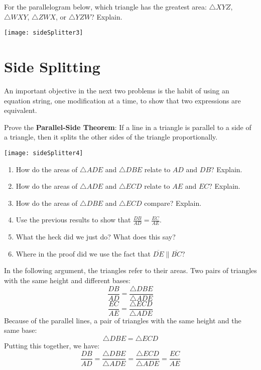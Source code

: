 \documentclass[nooutcomes]{ximera}
\begin{document}
\begin{problem}
For the parallelogram below, which triangle has the greatest area: $\triangle XYZ$, $\triangle WXY$, $\triangle ZWX$, or $\triangle YZW$?  Explain.  
\begin{image}
\texttt{[image: sideSplitter3]}
\end{image}
\vfill
\end{problem}

\newpage
\section*{Side Splitting}
\begin{teachingnote}
An important objective in the next two problems is the habit of using an equation string, one modification at a time, to show that two expressions are equivalent.
\end{teachingnote}

\begin{problem}
Prove the \textbf{Parallel-Side Theorem}:  If a line in a triangle is parallel to a side of a triangle, then it splits the other sides of the triangle proportionally. 
\begin{image}
\texttt{[image: sideSplitter4]}
\end{image}
\begin{enumerate}
\item How do the areas of $\triangle ADE$ and $\triangle DBE$ relate to $AD$ and $DB$?  Explain.  
\item How do the areas of $\triangle ADE$ and $\triangle ECD$ relate to $AE$ and $EC$?  Explain. 
\item How do the areas of $\triangle DBE$ and $\triangle ECD$ compare?  Explain.  
\item Use the previous results to show that $\frac{DB}{AD} = \frac{EC}{AE}$.  
\item What the heck did we just do?  What does this say?
\item Where in the proof did we use the fact that $\overline{DE} \parallel \overline{BC}$?  
\end{enumerate}
\vfill
\end{problem}

\newpage
\begin{teachingnote}
In the following argument, the triangles refer to their areas.  
Two pairs of triangles with the same height and different bases:  
\[
\frac{DB}{AD} = \frac{\triangle DBE}{\triangle ADE}
\]
\[
\frac{EC}{AE} = \frac{\triangle ECD}{\triangle ADE}
\]
Because of the parallel lines, a pair of triangles with the same height and the same base:  
\[
\triangle DBE = \triangle ECD
\]
Putting this together, we have:  
\[
\frac{DB}{AD} = \frac{\triangle DBE}{\triangle ADE} = \frac{\triangle ECD}{\triangle ADE}
=\frac{EC}{AE}
\]
\end{teachingnote}
\end{document}
